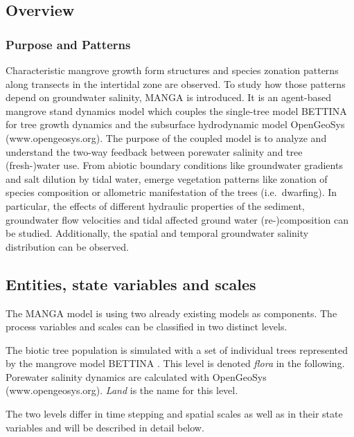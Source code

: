\subsection{Overview}
\subsubsection{Purpose and Patterns}
Characteristic mangrove growth form structures and species zonation patterns along transects in the intertidal zone are observed. 
To study how those patterns depend on groundwater salinity, MANGA is introduced.
It is an agent-based mangrove stand dynamics model which couples the single-tree model BETTINA \citep{Ronny2014} for tree growth dynamics and the subsurface hydrodynamic model OpenGeoSys (www.opengeosys.org).
The purpose of the coupled model is to analyze and understand the two-way feedback between porewater salinity and tree (fresh-)water use.
From abiotic boundary conditions like groundwater gradients and salt dilution by tidal water, emerge vegetation patterns like zonation of species composition or allometric manifestation of the trees (i.e.~dwarfing).
In particular, the effects of different hydraulic properties of the sediment, groundwater flow velocities and tidal affected ground water (re-)composition can be studied.
Additionally, the spatial and temporal groundwater salinity distribution can be observed.



\subsection{Entities, state variables and scales}
The MANGA model is using two already existing models as components.
The process variables and scales can be classified in two distinct levels.

The biotic tree population is simulated with a set of individual trees represented by the mangrove model BETTINA \citep{Ronny2014}.
This level is denoted \textit{flora} in the following.
Porewater salinity dynamics are calculated with OpenGeoSys (www.opengeosys.org).
\textit{Land} is the name for this level.

The two levels differ in time stepping and spatial scales as well as in their state variables and will be described in detail below.
